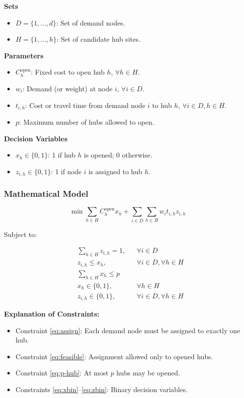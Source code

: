 \documentclass[conference]{IEEEtran}
\begin{document}
\textbf{Sets}
\begin{itemize}
    \item $D = \{1,\ldots,d\}$: Set of demand nodes.
    \item $H = \{1,\ldots,h\}$: Set of candidate hub sites.
\end{itemize}

\textbf{Parameters}
\begin{itemize}
    \item $C_h^{\text{open}}$: Fixed cost to open hub $h$, $\forall h \in H$.
    \item $w_i$: Demand (or weight) at node $i$, $\forall i \in D$.
    \item $t_{i,h}$: Cost or travel time from demand node $i$ to hub $h$, $\forall i \in D, h \in H$.
    \item $p$: Maximum number of hubs allowed to open.
\end{itemize}

\textbf{Decision Variables}
\begin{itemize}
    \item $x_h \in \{0,1\}$: 1 if hub $h$ is opened; 0 otherwise.
    \item $z_{i,h} \in \{0,1\}$: 1 if node $i$ is assigned to hub $h$.
\end{itemize}

\subsubsection{Mathematical Model}

\begin{equation}
\min \sum_{h \in H} C_{h}^{\text{open}} x_h 
    + \sum_{i \in D} \sum_{h \in H} w_i t_{i,h} z_{i,h}
\end{equation}

Subject to:

\begin{align}
&\sum_{h \in H} z_{i,h} = 1, && \forall i \in D \label{eq:assign} \\
&z_{i,h} \le x_h, && \forall i \in D, \forall h \in H \label{eq:feasible} \\
&\sum_{h \in H} x_h \le p \label{eq:p-hub}\\
&x_h \in \{0,1\}, && \forall h \in H \label{eq:xbin} \\
&z_{i,h} \in \{0,1\}, && \forall i \in D, \forall h \in H \label{eq:zbin}
\end{align}

\textbf{Explanation of Constraints:}
\begin{itemize}
    \item Constraint \eqref{eq:assign}: Each demand node must be assigned to exactly one hub.
    \item Constraint \eqref{eq:feasible}: Assignment allowed only to opened hubs.
    \item Constraint \eqref{eq:p-hub}: At most $p$ hubs may be opened.
    \item Constraints \eqref{eq:xbin}--\eqref{eq:zbin}: Binary decision variables.
\end{itemize}
\end{document}
